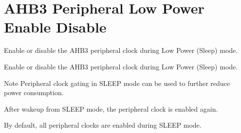 \hypertarget{group___r_c_c_ex___a_h_b3___low_power___enable___disable}{}\section{A\+H\+B3 Peripheral Low Power Enable Disable}
\label{group___r_c_c_ex___a_h_b3___low_power___enable___disable}


Enable or disable the A\+H\+B3 peripheral clock during Low Power (Sleep) mode.  


Enable or disable the A\+H\+B3 peripheral clock during Low Power (Sleep) mode. 

\begin{DoxyNote}{Note}
Peripheral clock gating in S\+L\+E\+EP mode can be used to further reduce power consumption. 

After wakeup from S\+L\+E\+EP mode, the peripheral clock is enabled again. 

By default, all peripheral clocks are enabled during S\+L\+E\+EP mode. 
\end{DoxyNote}
